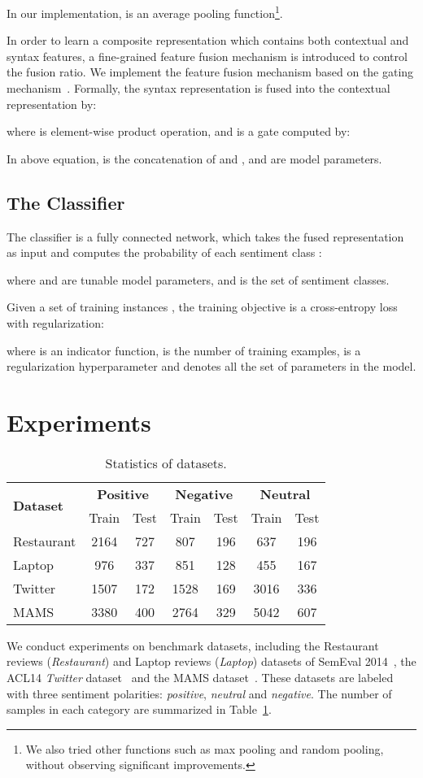 \documentclass[journal]{IEEEtran}
\begin{document}
	
	In our implementation,  is an average pooling function\footnote{We also tried other functions such as max pooling and random pooling, without observing significant improvements.}.
	
	In order to learn a composite representation which contains both contextual and syntax features, a fine-grained feature fusion mechanism is introduced to control the fusion ratio.
	We implement the feature fusion mechanism based on the gating mechanism~\cite{HochSchm97,cho-etal-2014-learning}.
	Formally, the syntax representation  is fused into the contextual representation  by:
	
	where  is element-wise product operation, and  is a gate computed by:
	

	In above equation,  is the concatenation of  and ,  and  are model parameters.
	\subsection{The Classifier}
	The classifier is a fully connected network, which takes the fused representation  as input and computes the probability of each sentiment class :
	
	where  and  are tunable model parameters, and  is the set of sentiment classes.
	
	Given a set of training instances , the training objective is a cross-entropy loss with  regularization:
	
	where  is an indicator function,  is the number of training examples,  is a regularization hyperparameter and  denotes all the set of parameters in the model.
	\section{Experiments}
	\begin{table}
		\centering
		\caption{Statistics of datasets.}
		\label{tab:1}
		\begin{tabular}{lcccccc}
			\toprule
			\multirow{2}{*}{\textbf{Dataset}}& \multicolumn{2}{c}{\textbf{Positive}} &\multicolumn{2}{c}{\textbf{Negative}} & \multicolumn{2}{c}{{\textbf{Neutral}}}\\
			\cmidrule(lr){2-3} \cmidrule(lr){4-5} \cmidrule(lr){6-7}
			&Train &Test &Train &Test &Train &Test\\
			\midrule
			Restaurant &2164 &727 &807 &196 &637 &196 \\
			Laptop &976 &337 &851 &128 &455 &167 \\
			Twitter &1507 &172 &1528 &169 &3016 &336 \\
			{MAMS} &{3380} &{400} &{2764} &{329} &{5042} &{607} \\
			\bottomrule
		\end{tabular}
	\end{table}
	We conduct experiments on  benchmark datasets, including the Restaurant reviews (\textit{Restaurant}) and Laptop reviews (\textit{Laptop}) datasets of SemEval 2014~\cite{pontiki-etal-2014-semeval}, the ACL14 \textit{Twitter} dataset~\cite{dong-etal-2014-adaptive} and the MAMS dataset~\cite{jiang-etal-2019-challenge}. These datasets are labeled with three sentiment polarities: \textit{positive}, \textit{neutral} and \textit{negative}. 
	The number of samples in each category are summarized in Table~\ref{tab:1}.
\end{document}
